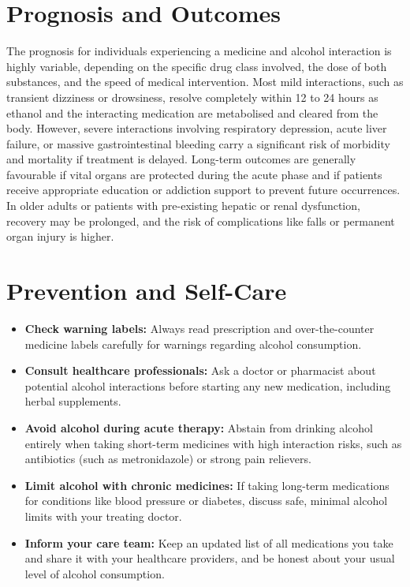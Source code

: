 \section*{Prognosis and Outcomes}
The prognosis for individuals experiencing a medicine and alcohol interaction is highly variable, depending on the specific drug class involved, the dose of both substances, and the speed of medical intervention. Most mild interactions, such as transient dizziness or drowsiness, resolve completely within 12 to 24 hours as ethanol and the interacting medication are metabolised and cleared from the body. However, severe interactions involving respiratory depression, acute liver failure, or massive gastrointestinal bleeding carry a significant risk of morbidity and mortality if treatment is delayed. Long-term outcomes are generally favourable if vital organs are protected during the acute phase and if patients receive appropriate education or addiction support to prevent future occurrences. In older adults or patients with pre-existing hepatic or renal dysfunction, recovery may be prolonged, and the risk of complications like falls or permanent organ injury is higher.

\section*{Prevention and Self-Care}
\begin{itemize}
    \item \textbf{Check warning labels:} Always read prescription and over-the-counter medicine labels carefully for warnings regarding alcohol consumption.
    \item \textbf{Consult healthcare professionals:} Ask a doctor or pharmacist about potential alcohol interactions before starting any new medication, including herbal supplements.
    \item \textbf{Avoid alcohol during acute therapy:} Abstain from drinking alcohol entirely when taking short-term medicines with high interaction risks, such as antibiotics (such as metronidazole) or strong pain relievers.
    \item \textbf{Limit alcohol with chronic medicines:} If taking long-term medications for conditions like blood pressure or diabetes, discuss safe, minimal alcohol limits with your treating doctor.
    \item \textbf{Inform your care team:} Keep an updated list of all medications you take and share it with your healthcare providers, and be honest about your usual level of alcohol consumption.
\end{itemize}

